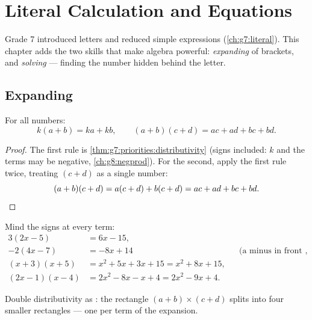 \chapter{Literal Calculation and Equations}\label{ch:g8:equations}

Grade 7 introduced letters and reduced simple expressions
(\cref{ch:g7:literal}). This chapter adds the two skills that make
algebra powerful: \emph{expanding}  of brackets, and
\emph{solving } --- finding the number hidden behind the
letter.

\section{Expanding}

\begin{theorem}\label{thm:g8:equations:expand}
For all numbers:
\[
k(a + b) = ka + kb,
\qquad
(a + b)(c + d) = ac + ad + bc + bd .
\]
\end{theorem}

\begin{proof}
The first rule is \cref{thm:g7:priorities:distributivity} (signs
included: $k$ and the terms may be negative,
\cref{ch:g8:negprod}). For the second, apply the first rule twice,
treating $(c + d)$ as a single number:
\[
(a + b)(c + d) = a(c + d) + b(c + d) = ac + ad + bc + bd .
\qedhere
\]
\end{proof}

\begin{example}\label{ex:g8:equations:expand}
Mind the signs at every term:
\begin{align*}
3(2x - 5) &= 6x - 15, \\
-2(4x - 7) &= -8x + 14
&& \text{(a minus in front flips both signs)}, \\
(x + 3)(x + 5) &= x^2 + 5x + 3x + 15 = x^2 + 8x + 15, \\
(2x - 1)(x - 4) &= 2x^2 - 8x - x + 4 = 2x^2 - 9x + 4 .
\end{align*}
\end{example}

\begin{omfigure}

{\small Double distributivity as : the rectangle
$(a+b) \times (c+d)$ splits into four smaller rectangles --- one per
term of the expansion.}
\end{omfigure}

